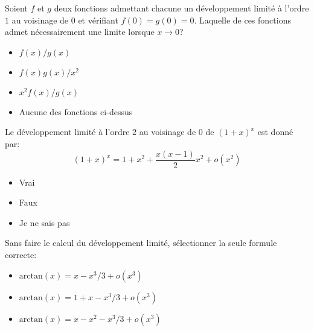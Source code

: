 \begin{clickers}
    Soient \(f\) et \(g\) deux fonctions admettant chacune un développement limité à l'ordre \(1\) au voisinage de \(0\) et vérifiant \(f(0)=g(0)=0\). Laquelle de ces fonctions admet nécessairement une limite lorsque \(x\to 0\)?
    \begin{itemize}
        \item \(f(x)/g(x)\)
        \item \(f(x)g(x)/x^2\)
        \item \(x^2f(x)/g(x)\)
        \item Aucune des fonctions ci-dessus
    \end{itemize}
\end{clickers}


\begin{clickers}
    Le développement limité à l'ordre \(2\) au voisinage de \(0\) de \((1+x)^x\) est donné par:
    \[ (1+x)^x = 1+x^2 + \frac{x(x-1)}{2}x^2+o(x^2)\]
    \begin{itemize}
        \item Vrai
        \item Faux
        \item Je ne sais pas
    \end{itemize}
\end{clickers}

\begin{clickers}
    Sans faire le calcul du développement limité, sélectionner la seule formule correcte:
    \begin{itemize}
        \item \( \mathrm{arctan}(x) = x-x^3/3 + o(x^3)\)
        \item \( \mathrm{arctan}(x) = 1 + x - x^3/3 + o(x^3)\)
        \item \( \mathrm{arctan}(x) = x-x^2 - x^3/3 + o(x^3)\)
    \end{itemize}
\end{clickers}
